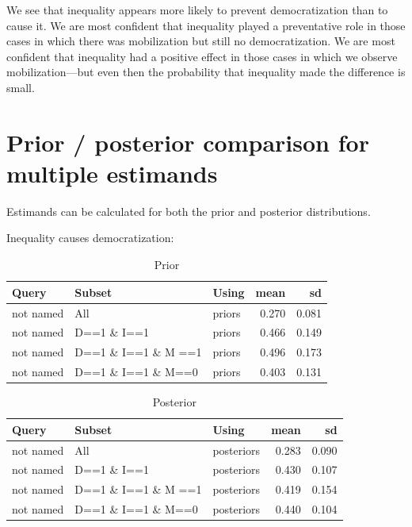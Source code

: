 \documentclass[12pt,]{book}
\begin{document}
We see that inequality appears more likely to prevent democratization than to cause it. We are most confident that inequality played a preventative role in those cases in which there was mobilization but still no democratization. We are most confident that inequality had a positive effect in those cases in which we observe mobilization---but even then the probability that inequality made the difference is small.

\hypertarget{prior-posterior-comparison-for-multiple-estimands}{%
\section{Prior / posterior comparison for multiple estimands}\label{prior-posterior-comparison-for-multiple-estimands}}

Estimands can be calculated for both the prior and posterior distributions.

Inequality causes democratization:

\begin{table}[t]

\caption{\label{tab:unnamed-chunk-62}Prior}
\centering
\begin{tabular}{l|l|l|r|r}
\hline
Query & Subset & Using & mean & sd\\
\hline
not named & All & priors & 0.270 & 0.081\\
\hline
not named & D==1 \& I==1 & priors & 0.466 & 0.149\\
\hline
not named & D==1 \& I==1 \& M ==1 & priors & 0.496 & 0.173\\
\hline
not named & D==1 \& I==1 \& M==0 & priors & 0.403 & 0.131\\
\hline
\end{tabular}
\end{table}

\begin{table}[t]

\caption{\label{tab:unnamed-chunk-62}Posterior}
\centering
\begin{tabular}{l|l|l|r|r}
\hline
Query & Subset & Using & mean & sd\\
\hline
not named & All & posteriors & 0.283 & 0.090\\
\hline
not named & D==1 \& I==1 & posteriors & 0.430 & 0.107\\
\hline
not named & D==1 \& I==1 \& M ==1 & posteriors & 0.419 & 0.154\\
\hline
not named & D==1 \& I==1 \& M==0 & posteriors & 0.440 & 0.104\\
\hline
\end{tabular}
\end{table}
\end{document}
